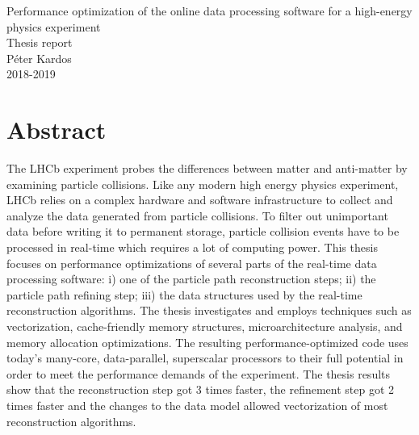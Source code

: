 \documentclass[12pt]{article}
\begin{document}
\begin{center}
	\Huge Performance optimization of the online data processing software for a high-energy physics experiment\\
	\Large Thesis report\\
	\vspace{1pc}
	\huge Péter Kardos \\
	\large 2018-2019
\end{center}


\section*{Abstract}

The LHCb experiment probes the differences between matter and anti-matter by examining particle collisions. Like any modern high energy physics experiment, LHCb relies on a complex hardware and software infrastructure to collect and analyze the data generated from particle collisions. To filter out unimportant data before writing it to permanent storage, particle collision events have to be processed in real-time which requires a lot of computing power.
This thesis focuses on performance optimizations of several parts of the real-time data processing software: i) one of the particle path reconstruction steps; ii) the particle path refining step; iii) the data structures used by the real-time reconstruction algorithms. The thesis investigates and employs techniques such as vectorization, cache-friendly memory structures, microarchitecture analysis, and memory allocation optimizations.
The resulting performance-optimized code uses today's many-core, data-parallel, superscalar processors to their full potential in order to meet the performance demands of the experiment. The thesis results show that the reconstruction step got 3 times faster, the refinement step got 2 times faster and the changes to the data model allowed vectorization of most reconstruction algorithms.

\end{document}
